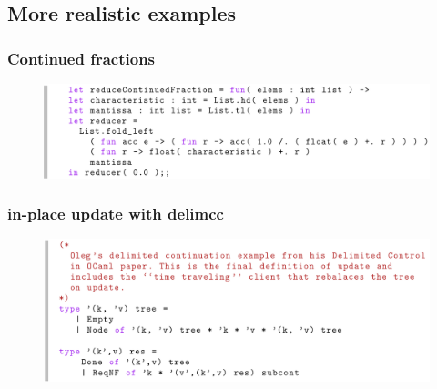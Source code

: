 \documentclass{beamer}
\begin{document}
  \subsection{More realistic examples}
  \begin{frame}
    \frametitle{Continued fractions}    
    \begin{figure}[ht]
      \begin{center}        
        \includegraphics[width=\textwidth,height=0.8\textheight,keepaspectratio]{pipelinefigures/CodeSampleContinuedFractions.pdf}
      \end{center}      
    \end{figure}
  \end{frame}
  \begin{frame}
    \frametitle{in-place update with delimcc}    
    \begin{figure}[ht]
      \begin{center}        
        \includegraphics[width=\textwidth,height=0.8\textheight,keepaspectratio]{pipelinefigures/CodeSamplesDelimCCInplaceUpdateTypes.pdf}
      \end{center}      
    \end{figure}
  \end{frame}
\end{document}
